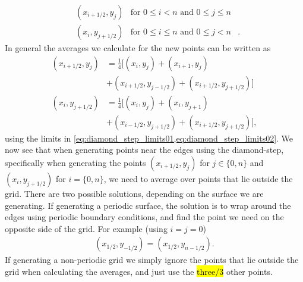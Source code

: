 \begin{align}
    &(x_{i+1/2}, y_j) &\text{for } 0\leq i<n \text{ and } 0\leq j \leq n& \label{eq:diamond_step_limits01}\\
    &(x_i, y_{j+1/2}) &\text{for } 0\leq i\leq n \text{ and } 0\leq j < n&. \label{eq:diamond_step_limits02}
\end{align}
In general the averages we calculate for the new points can be written as
\begin{align}
    (x_{i+1/2}, y_j) 
    &= 
    \frac{1}{4}\big[
        (x_i, y_j) + (x_{i+1}, y_j) \nonumber\\
        &+ (x_{i+1/2}, y_{j-1/2}) + (x_{i+1/2}, y_{j+1/2})
    \big]
    \label{eq:diamond_step01}\\
    (x_i, y_{j+1/2}) 
    &= 
    \frac{1}{4}\big[
        (x_i, y_j) + (x_i, y_{j+1}) \nonumber\\
        &+ (x_{i-1/2}, y_{j+1/2}) + (x_{i+1/2}, y_{j+1/2})
    \big],
    \label{eq:diamond_step02}
\end{align}
using the limits in \cref{eq:diamond_step_limits01,eq:diamond_step_limits02}. We now see that when generating points near the edges using the diamond-step, specifically when generating the points $(x_{i+1/2}, y_j)$ for $j \in \{0, n\}$ and $(x_i, y_{j+1/2})$ for $i = \{0, n\}$, we need to average over points that lie outside the grid. There are two possible solutions, depending on the surface we are generating. If generating a periodic surface, the solution is to wrap around the edges using periodic boundary conditions, and find the point we need on the opposite side of the grid. For example (using $i = j = 0$)
\begin{align*}
    (x_{1/2}, y_{-1/2}) = (x_{1/2}, y_{n-1/2}).
\end{align*}
If generating a non-periodic grid we simply ignore the points that lie outside the grid when calculating the averages, and just use the \hl{three/3} other points.

